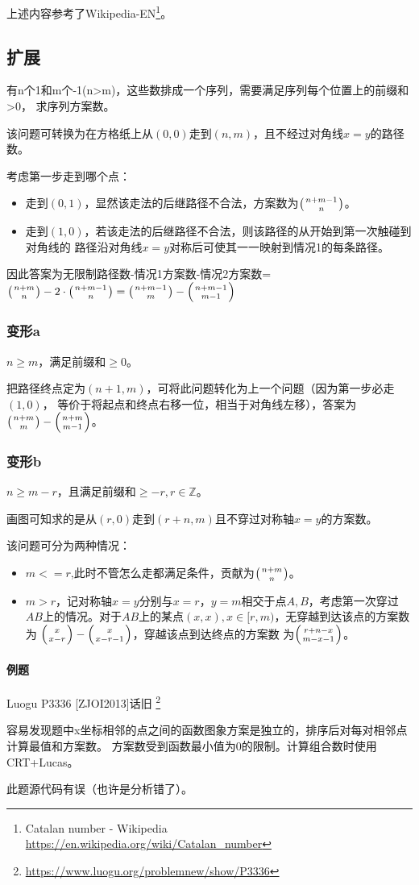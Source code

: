 上述内容参考了Wikipedia-EN\footnote{Catalan number - Wikipedia
	\url{https://en.wikipedia.org/wiki/Catalan\_number}}。
\subsection{扩展}
有n个1和m个-1(n>m)，这些数排成一个序列，需要满足序列每个位置上的前缀和>0，
求序列方案数。

该问题可转换为在方格纸上从$(0,0)$走到$(n,m)$，且不经过对角线$x=y$的路径数。

考虑第一步走到哪个点：
\begin{itemize}
	\item 走到$(0,1)$，显然该走法的后继路径不合法，方案数为$\left(n+m-1 \atop n\right)$。
	\item 走到$(1,0)$，若该走法的后继路径不合法，则该路径的从开始到第一次触碰到对角线的
	路径沿对角线$x=y$对称后可使其一一映射到情况1的每条路径。
\end{itemize}

因此答案为无限制路径数-情况1方案数-情况2方案数=$\left(n+m \atop n\right)-
2\cdot\left(n+m-1 \atop n\right)=\left(n+m-1 \atop m\right)-\left(n+m-1 \atop m-1\right)$
\subsubsection{变形a}
$n\geq m$，满足前缀和$\geq 0$。

把路径终点定为$(n+1,m)$，可将此问题转化为上一个问题（因为第一步必走$(1,0)$，
等价于将起点和终点右移一位，相当于对角线左移），答案为
$\left(n+m \atop m\right)-\left(n+m \atop m-1\right)$。
\subsubsection{变形b}
$n\geq m-r$，且满足前缀和$\geq -r,r\in \mathbb{Z}$。

画图可知求的是从$(r,0)$走到$(r+n,m)$且不穿过对称轴$x=y$的方案数。

该问题可分为两种情况：
\begin{itemize}
	\item $m<=r$,此时不管怎么走都满足条件，贡献为$\left(n+m \atop n\right)$。
	\item $m>r$，记对称轴$x=y$分别与$x=r$，$y=m$相交于点$A,B$，考虑第一次穿过
	$AB$上的情况。对于$AB$上的某点$(x,x),x\in [r,m)$，无穿越到达该点的方案数为
	$\left(x \atop x-r\right)-\left(x \atop x-r-1\right)$，穿越该点到达终点的方案数
	为$\left(r+n-x \atop m-x-1\right)$。
\end{itemize}

\paragraph{例题}
Luogu P3336 [ZJOI2013]话旧
\footnote{\url{https://www.luogu.org/problemnew/show/P3336}}

容易发现题中x坐标相邻的点之间的函数图象方案是独立的，排序后对每对相邻点计算最值和方案数。
方案数受到函数最小值为0的限制。计算组合数时使用CRT+Lucas。

此题源代码有误（也许是分析错了）。


